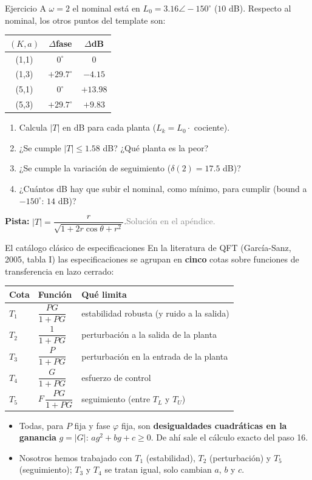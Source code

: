\documentclass[aspectratio=169,11pt]{beamer}
\begin{document}
\begin{frame}{Ejercicio}
  \footnotesize
  A $\omega=2$ el nominal está en $L_0=3.16\angle-150^\circ$ ($10$ dB). Respecto al nominal, los otros puntos del template son:
  \begin{center}
  \begin{tabular}{c|c|c}
    $(K,a)$ & $\Delta$fase & $\Delta$dB\\\hline
    (1,1) & $0^\circ$ & $0$\\
    (1,3) & $+29.7^\circ$ & $-4.15$\\
    (5,1) & $0^\circ$ & $+13.98$\\
    (5,3) & $+29.7^\circ$ & $+9.83$
  \end{tabular}
  \end{center}
  \begin{enumerate}
    \item Calcula $|T|$ en dB para cada planta ($L_k=L_0\cdot$ cociente).
    \item ¿Se cumple $|T|\le1.58$ dB? ¿Qué planta es la peor?
    \item ¿Se cumple la variación de seguimiento ($\delta(2)=17.5$ dB)?
    \item ¿Cuántos dB hay que subir el nominal, como mínimo, para cumplir (bound a $-150^\circ$: $14$ dB)?
  \end{enumerate}
  \textbf{Pista:} $|T|=\dfrac{r}{\sqrt{1+2r\cos\theta+r^2}}$.\quad\textcolor{gray}{Solución en el apéndice.}
\end{frame}

\begin{frame}{El catálogo clásico de especificaciones}
  \small
  En la literatura de QFT (García-Sanz, 2005, tabla I) las especificaciones se agrupan en \textbf{cinco} cotas sobre funciones de transferencia en lazo cerrado:
  \begin{center}\footnotesize
  \begin{tabular}{lll}
    \hline
    Cota & Función & Qué limita\\
    \hline
    $T_1$ & $\dfrac{PG}{1+PG}$ & estabilidad robusta (y ruido a la salida)\\
    $T_2$ & $\dfrac{1}{1+PG}$ & perturbación a la salida de la planta\\
    $T_3$ & $\dfrac{P}{1+PG}$ & perturbación en la entrada de la planta\\
    $T_4$ & $\dfrac{G}{1+PG}$ & esfuerzo de control\\
    $T_5$ & $F\,\dfrac{PG}{1+PG}$ & seguimiento (entre $T_L$ y $T_U$)\\
    \hline
  \end{tabular}
  \end{center}
  \begin{itemize}
    \item Todas, para $P$ fija y fase $\varphi$ fija, son \textbf{desigualdades cuadráticas en la ganancia} $g=|G|$: $a g^2+bg+c\ge0$. De ahí sale el cálculo exacto del paso 16.
    \item Nosotros hemos trabajado con $T_1$ (estabilidad), $T_2$ (perturbación) y $T_5$ (seguimiento); $T_3$ y $T_4$ se tratan igual, solo cambian $a$, $b$ y $c$.
  \end{itemize}
\end{frame}
\end{document}

